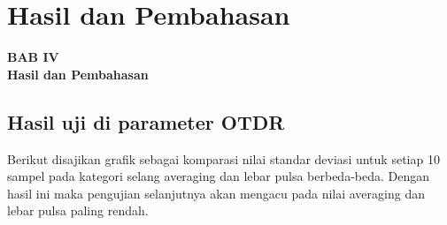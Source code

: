 \documentclass[12pt]{article}
\begin{document}
\newpage
\thispagestyle{plain}
\mbox{}
	
\newpage
	
	\section{Hasil dan Pembahasan}
	
	\begin{center}
		{\large \textbf{BAB IV}} \\
		{\large \textbf{Hasil dan Pembahasan}}
	\end{center}
	
	\subsection{Hasil uji di parameter OTDR}
	
	Berikut disajikan grafik sebagai komparasi nilai standar deviasi untuk setiap 10 sampel pada kategori selang averaging dan lebar pulsa berbeda-beda.
	Dengan hasil ini maka pengujian selanjutnya akan mengacu pada nilai averaging dan lebar pulsa paling rendah.
	
\end{document}
